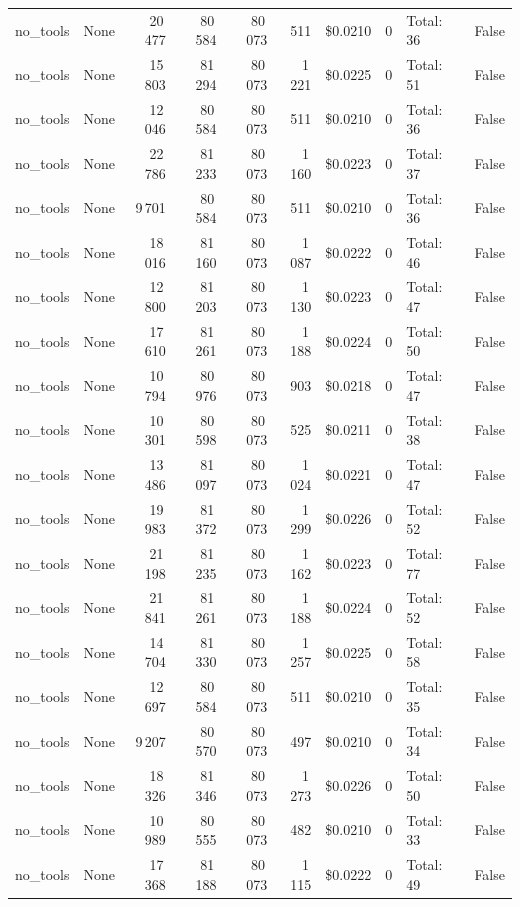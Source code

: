 \documentclass[a4paper,11pt]{article}
\begin{document}
\begin{table}[H]
{\begin{tabular}{l r r r r r r r l r}
no\_tools & None & 20\,477 & 80\,584 & 80\,073 & 511 & \$0.0210 & 0 & Total: 36 & False \\
no\_tools & None & 15\,803 & 81\,294 & 80\,073 & 1\,221 & \$0.0225 & 0 & Total: 51 & False \\
no\_tools & None & 12\,046 & 80\,584 & 80\,073 & 511 & \$0.0210 & 0 & Total: 36 & False \\
no\_tools & None & 22\,786 & 81\,233 & 80\,073 & 1\,160 & \$0.0223 & 0 & Total: 37 & False \\
no\_tools & None & 9\,701 & 80\,584 & 80\,073 & 511 & \$0.0210 & 0 & Total: 36 & False \\
no\_tools & None & 18\,016 & 81\,160 & 80\,073 & 1\,087 & \$0.0222 & 0 & Total: 46 & False \\
no\_tools & None & 12\,800 & 81\,203 & 80\,073 & 1\,130 & \$0.0223 & 0 & Total: 47 & False \\
no\_tools & None & 17\,610 & 81\,261 & 80\,073 & 1\,188 & \$0.0224 & 0 & Total: 50 & False \\
no\_tools & None & 10\,794 & 80\,976 & 80\,073 & 903 & \$0.0218 & 0 & Total: 47 & False \\
no\_tools & None & 10\,301 & 80\,598 & 80\,073 & 525 & \$0.0211 & 0 & Total: 38 & False \\
no\_tools & None & 13\,486 & 81\,097 & 80\,073 & 1\,024 & \$0.0221 & 0 & Total: 47 & False \\
no\_tools & None & 19\,983 & 81\,372 & 80\,073 & 1\,299 & \$0.0226 & 0 & Total: 52 & False \\
no\_tools & None & 21\,198 & 81\,235 & 80\,073 & 1\,162 & \$0.0223 & 0 & Total: 77 & False \\
no\_tools & None & 21\,841 & 81\,261 & 80\,073 & 1\,188 & \$0.0224 & 0 & Total: 52 & False \\
no\_tools & None & 14\,704 & 81\,330 & 80\,073 & 1\,257 & \$0.0225 & 0 & Total: 58 & False \\
no\_tools & None & 12\,697 & 80\,584 & 80\,073 & 511 & \$0.0210 & 0 & Total: 35 & False \\
no\_tools & None & 9\,207 & 80\,570 & 80\,073 & 497 & \$0.0210 & 0 & Total: 34 & False \\
no\_tools & None & 18\,326 & 81\,346 & 80\,073 & 1\,273 & \$0.0226 & 0 & Total: 50 & False \\
no\_tools & None & 10\,989 & 80\,555 & 80\,073 & 482 & \$0.0210 & 0 & Total: 33 & False \\
no\_tools & None & 17\,368 & 81\,188 & 80\,073 & 1\,115 & \$0.0222 & 0 & Total: 49 & False \\

\end{tabular}}
\end{table}
\end{document}
